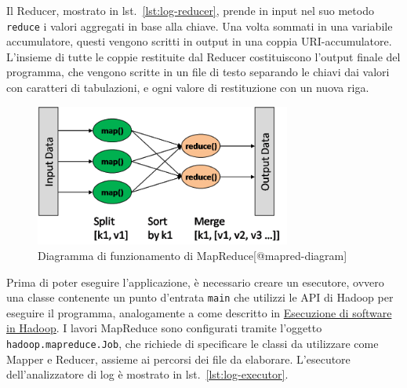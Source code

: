 \documentclass[italian,a4paper, twoside, 12pt]{report}
\begin{document}
Il Reducer, mostrato in lst.~\ref{lst:log-reducer}, prende in input nel
suo metodo \lstinline!reduce! i valori aggregati in base alla chiave.
Una volta sommati in una variabile accumulatore, questi vengono scritti
in output in una coppia URI-accumulatore. L'insieme di tutte le coppie
restituite dal Reducer costituiscono l'output finale del programma, che
vengono scritte in un file di testo separando le chiavi dai valori con
caratteri di tabulazioni, e ogni valore di restituzione con un nuova
riga.

\begin{figure}
\centering
\includegraphics[width=0.75000\textwidth]{img/mapreduce_diagram.png}
\caption{Diagramma di funzionamento di MapReduce{[}@mapred-diagram{]}}
\end{figure}

Prima di poter eseguire l'applicazione, è necessario creare un
esecutore, ovvero una classe contenente un punto d'entrata
\lstinline!main! che utilizzi le API di Hadoop per eseguire il
programma, analogamente a come descritto in
\protect\hyperlink{esecuzione-di-software-in-hadoop}{Esecuzione di
software in Hadoop}. I lavori MapReduce sono configurati tramite
l'oggetto \lstinline!hadoop.mapreduce.Job!, che richiede di specificare
le classi da utilizzare come Mapper e Reducer, assieme ai percorsi dei
file da elaborare. L'esecutore dell'analizzatore di log è mostrato in
lst.~\ref{lst:log-executor}.
\end{document}
